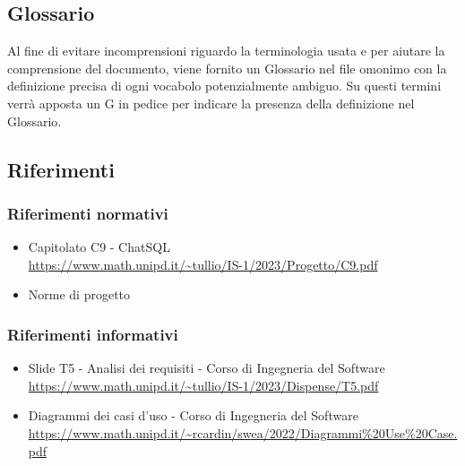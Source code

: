 \subsection{Glossario}
Al fine di evitare incomprensioni riguardo la terminologia usata e per aiutare la comprensione del documento, viene fornito un Glossario nel file omonimo con la definizione precisa di ogni vocabolo potenzialmente ambiguo. Su questi termini verrà apposta un G in pedice per indicare la presenza della definizione nel Glossario.

\subsection{Riferimenti}
\subsubsection{Riferimenti normativi}
\begin{itemize}
	\item Capitolato C9 - ChatSQL \\ \url{https://www.math.unipd.it/~tullio/IS-1/2023/Progetto/C9.pdf}
	\item Norme di progetto
\end{itemize}

\subsubsection{Riferimenti informativi}
\begin{itemize}
	\item Slide T5 - Analisi dei requisiti - Corso di Ingegneria del Software \\ \url{https://www.math.unipd.it/~tullio/IS-1/2023/Dispense/T5.pdf}
	\item Diagrammi dei casi d'uso - Corso di Ingegneria del Software \\ \url{https://www.math.unipd.it/~rcardin/swea/2022/Diagrammi%20Use%20Case.pdf}
\end{itemize}